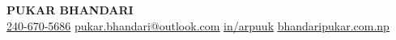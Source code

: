 \begin{center}
    \textbf{\Huge \scshape PUKAR BHANDARI} \\ \vspace{1pt}
    \href{tel:+12406705686} { \small 240-670-5686} \quad
    \href{mailto:pukar.bhandari@outlook.com}{ \underline{pukar.bhandari@outlook.com}} \quad
    \href{https://www.linkedin.com/in/arpuuk}{ \underline{in/arpuuk}} \quad
    \href{https://www.bhandaripukar.com.np/}{ \underline{bhandaripukar.com.np}} \quad
\end{center}